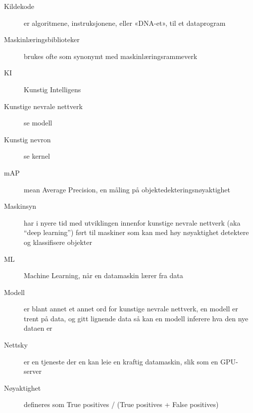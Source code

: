\begin{description}
\item[Kildekode] er algoritmene, instruksjonene, eller «DNA-et», til et dataprogram
\item[Maskinlæringsbiblioteker] brukes ofte som synonymt med maskinlæringsrammeverk
\item[KI] Kunstig Intelligens
\item[Kunstige nevrale nettverk] se modell
\item[Kunstig nevron] se kernel
\item[mAP] mean Average Precision, en måling på objektedekteringsnøyaktighet
\item[Maskinsyn] har i nyere tid med utviklingen innenfor kunstige nevrale nettverk (aka “deep learning”) ført til maskiner som kan med høy nøyaktighet detektere og klassifisere objekter%
\item[ML] Machine Learning, når en datamaskin lærer fra data
\item[Modell] er blant annet et annet ord for kunstige nevrale nettverk, en modell er trent på data, og gitt lignende data så kan en modell inferere hva den nye dataen er 
\item[Nettsky] er en tjeneste der en kan leie en kraftig datamaskin, slik som en GPU-server
\item[Nøyaktighet] defineres som True positives / (True positives + False positives)

\end{description}
